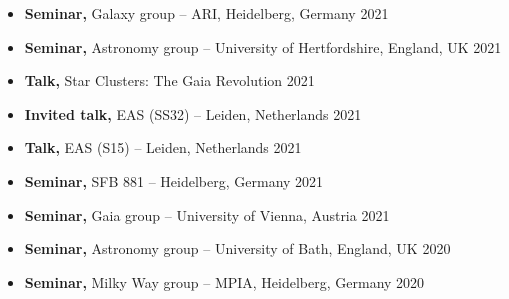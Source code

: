 \begin{itemize}
    \item \textbf{Seminar,} Galaxy group -- ARI, Heidelberg, Germany \hfill 2021
    \item \textbf{Seminar,} Astronomy group -- University of Hertfordshire, England, UK \hfill 2021
    \item \textbf{Talk,} Star Clusters: The Gaia Revolution \hfill 2021
    \item \textbf{Invited talk,} EAS (SS32) -- Leiden, Netherlands \hfill 2021
    \item \textbf{Talk,} EAS (S15) -- Leiden, Netherlands \hfill 2021
    \item \textbf{Seminar,} SFB 881 -- Heidelberg, Germany \hfill 2021
    \item \textbf{Seminar,} Gaia group -- University of Vienna, Austria \hfill 2021
    \item \textbf{Seminar,} Astronomy group -- University of Bath, England, UK \hfill 2020
    \item \textbf{Seminar,} Milky Way group -- MPIA, Heidelberg, Germany \hfill 2020
\end{itemize}
